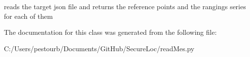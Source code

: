 \begin{DoxyVerb}reads the target json file and returns the reference points 
and the rangings series for each of them\end{DoxyVerb}
 

The documentation for this class was generated from the following file\+:\begin{DoxyCompactItemize}
\item 
C\+:/\+Users/pestourb/\+Documents/\+Git\+Hub/\+Secure\+Loc/read\+Mes.\+py\end{DoxyCompactItemize}
